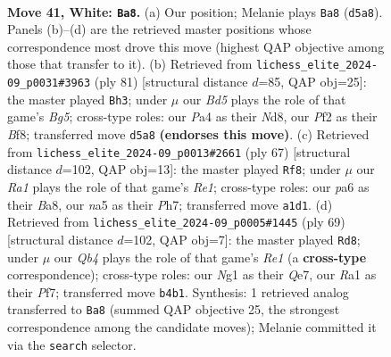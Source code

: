 \documentclass[11pt]{article}
\begin{document}
\clearpage

\begin{figure}[p]\centering
\begin{subfigure}{0.46\textwidth}\centering
\resizebox{\linewidth}{!}{%
\newchessgame
\chessboard[
  setfen={3qn3/3b2k1/p6r/n2BPp1p/PQ1P2p1/N7/5PPP/R3K1N1 w - - 4 41},
  showmover=false,
  pgfstyle=straightmove, color=movearrow, markmove={d5-a8}
]}
\caption{}
\end{subfigure}\hfill
\begin{subfigure}{0.46\textwidth}\centering
\resizebox{\linewidth}{!}{%
\newchessgame
\chessboard[
  setfen={1r1n1bk1/6p1/1q5p/NppPN3/6bP/6P1/1B3P2/2R1Q1K1 b - - 0 41},
  showmover=false,
  pgfstyle=straightmove, color=movearrow, markmove={g4-h3}
]}
\caption{}
\end{subfigure}
\\[4pt]
\begin{subfigure}{0.46\textwidth}\centering
\resizebox{\linewidth}{!}{%
\newchessgame
\chessboard[
  setfen={b3r1k1/4q2p/p2pp1pQ/1p2n3/4P3/P1P4P/2PNBRP1/7K b - - 2 34},
  showmover=false,
  pgfstyle=straightmove, color=movearrow, markmove={e8-f8}
]}
\caption{}
\end{subfigure}\hfill
\begin{subfigure}{0.46\textwidth}\centering
\resizebox{\linewidth}{!}{%
\newchessgame
\chessboard[
  setfen={4r1k1/4qpp1/1p2n2p/pNb5/P6P/2P2QP1/1P6/2BR3K b - - 0 35},
  showmover=false,
  pgfstyle=straightmove, color=movearrow, markmove={e8-d8}
]}
\caption{}
\end{subfigure}
\caption{\textbf{Move 41, White: \texttt{Ba8}.} (a) Our position; Melanie plays \texttt{Ba8} (\texttt{d5a8}). Panels (b)--(d) are the retrieved master positions whose correspondence most drove this move (highest QAP objective among those that transfer to it). (b) Retrieved from \texttt{lichess\_elite\_2024-09\_p0031\#3963} (ply 81) [structural distance $d$=85, QAP obj=25]: the master played \texttt{Bh3}; under $\mu$ our \emph{Bd5} plays the role of that game's \emph{Bg5}; cross-type roles: our \emph{P}a4 as their \emph{N}d8, our \emph{P}f2 as their \emph{B}f8; transferred move \texttt{d5a8} \textbf{(endorses this move)}. (c) Retrieved from \texttt{lichess\_elite\_2024-09\_p0013\#2661} (ply 67) [structural distance $d$=102, QAP obj=13]: the master played \texttt{Rf8}; under $\mu$ our \emph{Ra1} plays the role of that game's \emph{Re1}; cross-type roles: our \emph{p}a6 as their \emph{B}a8, our \emph{n}a5 as their \emph{P}h7; transferred move \texttt{a1d1}. (d) Retrieved from \texttt{lichess\_elite\_2024-09\_p0005\#1445} (ply 69) [structural distance $d$=102, QAP obj=7]: the master played \texttt{Rd8}; under $\mu$ our \emph{Qb4} plays the role of that game's \emph{Re1} (a \textbf{cross-type} correspondence); cross-type roles: our \emph{N}g1 as their \emph{Q}e7, our \emph{R}a1 as their \emph{P}f7; transferred move \texttt{b4b1}. Synthesis: 1 retrieved analog transferred to \texttt{Ba8} (summed QAP objective 25, the strongest correspondence among the candidate moves); Melanie committed it via the \texttt{search} selector.}
\label{fig:thought-m80}
\end{figure}
\end{document}

